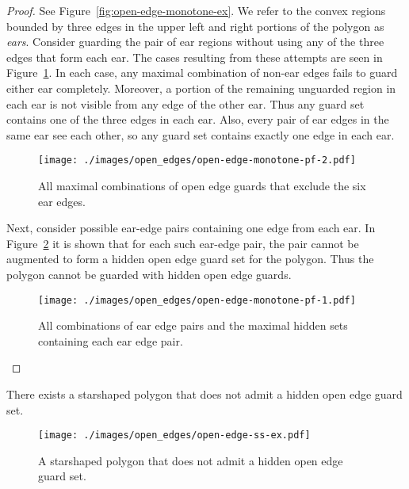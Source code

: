 \documentclass{cccg12}
\begin{document}
\begin{proof}
See Figure~\ref{fig:open-edge-monotone-ex}.
We refer to the convex regions bounded by three edges in the upper left and right portions of the polygon as \emph{ears}. 
Consider guarding the pair of ear regions without using any of the three edges that form each ear.
The cases resulting from these attempts are seen in Figure~\ref{fig:open-edge-monotone-pf-2}.
In each case, any maximal combination of non-ear edges fails to guard either ear completely.
Moreover, a portion of the remaining unguarded region in each ear is not visible from any edge of the other ear.
Thus any guard set contains one of the three edges in each ear.
Also, every pair of ear edges in the same ear see each other, so any guard set contains exactly one edge in each ear.

\begin{figure}[ht]
\centering
\texttt{[image: ./images/open\_edges/open-edge-monotone-pf-2.pdf]}
\caption{All maximal combinations of open edge guards that exclude the six ear edges.} 
\label{fig:open-edge-monotone-pf-2}
\end{figure}

Next, consider possible ear-edge pairs containing one edge from each ear.
In Figure~\ref{fig:open-edge-monotone-pf-1} it is shown that for each such ear-edge pair, the pair cannot be augmented to form a hidden open edge guard set for the polygon.
Thus the polygon cannot be guarded with hidden open edge guards. 

\begin{figure}[ht]
\centering
\texttt{[image: ./images/open\_edges/open-edge-monotone-pf-1.pdf]}
\caption{All combinations of ear edge pairs and the maximal hidden sets containing each ear edge pair.}
\label{fig:open-edge-monotone-pf-1}
\end{figure}

\end{proof}


\begin{lemma}
There exists a starshaped polygon that does not admit a hidden open edge guard set.
\end{lemma}


\begin{figure}[ht]
\centering
\texttt{[image: ./images/open\_edges/open-edge-ss-ex.pdf]}
\caption{A starshaped polygon that does not admit a hidden open edge guard set.}
\label{fig:open-edge-ss-ex}
\end{figure}
\end{document}

